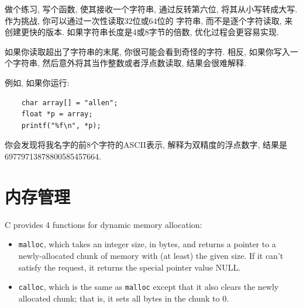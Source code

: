 \documentclass[12pt]{book}
\begin{document}
{%
做个练习, 写个函数, 使其接收一个字符串, 通过反转第六位, 
将其从小写转成大写. 作为挑战, 你可以通过一次性读取32位或64位的
字符串, 而不是逐个字符读取, 来创建更快的版本. 
如果字符串长度是4或8字节的倍数, 优化过程会更容易实现.

如果你读取超出了字符串的末尾, 你很可能会看到奇怪的字符. 
相反, 如果你写入一个字符串, 然后意外将其当作整数或者浮点数读取, 
结果会很难解释.

例如, 如果你运行:

\begin{verbatim}
    char array[] = "allen";
    float *p = array;
    printf("%f\n", *p);
\end{verbatim}

你会发现将我名字的前8个字符的ASCII表示, 解释为双精度的浮点数字, 
结果是69779713878800585457664.



\chapter{内存管理}

C provides 4 functions for dynamic memory allocation:

\begin{itemize}

\item {\tt malloc}, which takes an integer size, in bytes, and returns
a pointer to a newly-allocated chunk of memory with (at least) the
given size.  If it can't satisfy the request, it returns
the special pointer value NULL.

\item {\tt calloc}, which is the same as {\tt malloc} except that
it also clears the newly allocated chunk; that
is, it sets all bytes in the chunk to 0.


\end{itemize}}
\end{document}
